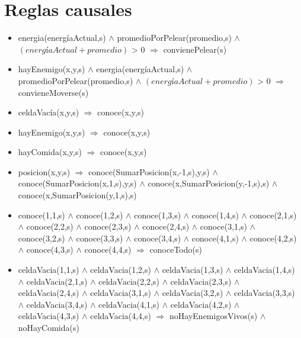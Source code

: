 \section{Reglas causales}

\begin{itemize}

\item  energia(energíaActual,s)
$\land$ promedioPorPelear(promedio,s) $\land$ $(energíaActual + promedio)$ > 0
$\Rightarrow$ convienePelear(s)

\item hayEnemigo(x,y,s) $\land$ energia(energíaActual,s)
$\land$ promedioPorPelear(promedio,s) $\land$ $(energíaActual + promedio)$ > 0
$\Rightarrow$ convieneMoverse(s)

\item celdaVacía(x,y,s) $\Rightarrow$
 conoce(x,y,s)
 
\item hayEnemigo(x,y,s) $\Rightarrow$
 conoce(x,y,s)

\item hayComida(x,y,s) $\Rightarrow$
 conoce(x,y,s)

\item posicion(x,y,s) $\Rightarrow$
 conoce(SumarPosicion(x,-1,s),y,s) $\land$  
 conoce(SumarPosicion(x,1,s),y,s) $\land$ 
 conoce(x,SumarPosicion(y,-1,s),s) $\land$ 
 conoce(x,SumarPosicion(y,1,s),s) 
 
\item conoce(1,1,s) $\land$ conoce(1,2,s) $\land$ 
 conoce(1,3,s) $\land$ conoce(1,4,s) $\land$ 
 \newline 
 conoce(2,1,s) $\land$ conoce(2,2,s) $\land$ 
 conoce(2,3,s) $\land$ conoce(2,4,s) $\land$ 
 \newline 
 conoce(3,1,s) $\land$ conoce(3,2,s) $\land$ 
 conoce(3,3,s) $\land$ conoce(3,4,s) $\land$ 
 \newline 
 conoce(4,1,s) $\land$ conoce(4,2,s) $\land$ 
 conoce(4,3,s) $\land$ conoce(4,4,s) 
 \newline
 $\Rightarrow$ conoceTodo(s)
 
\item celdaVacia(1,1,s) $\land$ celdaVacia(1,2,s) $\land$ celdaVacia(1,3,s) $\land$ 
 celdaVacia(1,4,s) $\land$ celdaVacia(2,1,s) $\land$ celdaVacia(2,2,s) $\land$ 
 celdaVacia(2,3,s) $\land$ celdaVacia(2,4,s) $\land$ celdaVacia(3,1,s) $\land$ 
 celdaVacia(3,2,s) $\land$ celdaVacia(3,3,s) $\land$ celdaVacia(3,4,s) $\land$ 
 celdaVacia(4,1,s) $\land$ celdaVacia(4,2,s) $\land$ celdaVacia(4,3,s) $\land$ 
 celdaVacia(4,4,s) 
 $\Rightarrow$ noHayEnemigosVivos(s) $\land$ noHayComida(s)
 

\end{itemize}

